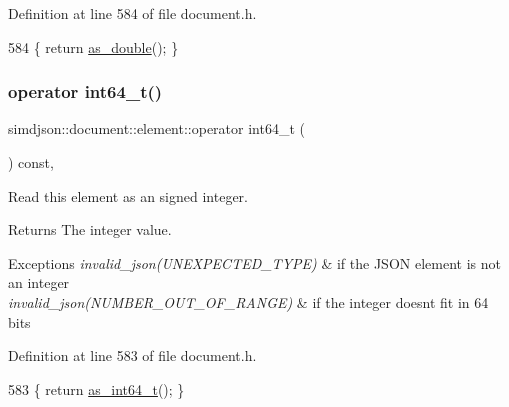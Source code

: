 Definition at line 584 of file document.\+h.


\begin{DoxyCode}
584 \{ \textcolor{keywordflow}{return} \hyperlink{classsimdjson_1_1document_1_1element_a1d6014890ca8f9fddbd97ab8c81a711c}{as\_double}(); \}
\end{DoxyCode}
\mbox{\label{classsimdjson_1_1document_1_1element_a89305767fe78b8ad76fadf0f2f5e2836}} 
\subsubsection{\texorpdfstring{operator int64\+\_\+t()}{operator int64\_t()}}
{\footnotesize\ttfamily simdjson\+::document\+::element\+::operator int64\+\_\+t (\begin{DoxyParamCaption}{ }\end{DoxyParamCaption}) const\hspace{0.3cm}{\ttfamily [inline]}, {\ttfamily [noexcept]}}



Read this element as an signed integer. 

\begin{DoxyReturn}{Returns}
The integer value. 
\end{DoxyReturn}

\begin{DoxyExceptions}{Exceptions}
{\em invalid\+\_\+json(\+U\+N\+E\+X\+P\+E\+C\+T\+E\+D\+\_\+\+T\+Y\+P\+E)} & if the J\+S\+ON element is not an integer \\
\hline
{\em invalid\+\_\+json(\+N\+U\+M\+B\+E\+R\+\_\+\+O\+U\+T\+\_\+\+O\+F\+\_\+\+R\+A\+N\+G\+E)} & if the integer doesn\textquotesingle{}t fit in 64 bits \\
\hline
\end{DoxyExceptions}


Definition at line 583 of file document.\+h.


\begin{DoxyCode}
583 \{ \textcolor{keywordflow}{return} \hyperlink{classsimdjson_1_1document_1_1element_ad02cc5dbfb8ae3d5309f8456759120e7}{as\_int64\_t}(); \}
\end{DoxyCode}
\mbox{\label{classsimdjson_1_1document_1_1element_ad907f21076cc2a2f1352234fe18c8f94}} 
